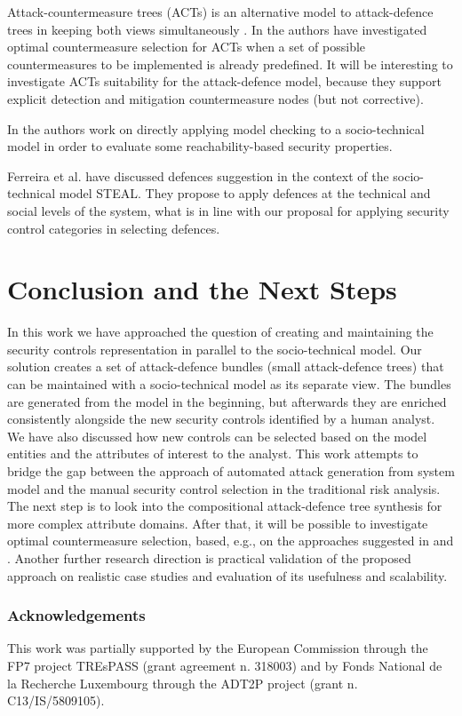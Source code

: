 \documentclass{llncs}
\begin{document}
Attack-countermeasure trees (ACTs) is an alternative model to attack-defence trees in keeping both views simultaneously \cite{Roy-SCN-2011}. In \cite{Roy-DSN-2012} the authors have investigated optimal countermeasure selection for ACTs when a set of possible countermeasures to be implemented is already predefined. It will be interesting to investigate ACTs suitability for the attack-defence model, because they support explicit detection and mitigation countermeasure nodes (but not corrective). 

In \cite{Lenzini-2015} the authors work on directly applying model checking to a socio-technical model in order to evaluate some reachability-based security properties. 

Ferreira et al. \cite{STEAL-2014} have discussed defences suggestion in the context of the socio-technical model STEAL. They propose to apply defences at the technical and social levels of the system, what is in line with our proposal for applying security control categories in selecting defences.

\section{Conclusion and the Next Steps}

In this work we have approached the question of creating and maintaining the security controls representation in parallel to the socio-technical model. Our solution creates a set of attack-defence bundles (small attack-defence trees) that can be maintained with a socio-technical model as its separate view. The bundles are generated from the model in the beginning, but afterwards they are enriched consistently alongside the new security controls identified by a human analyst. We have also discussed how new controls can be selected based on the model entities and the attributes of interest to the analyst. This work attempts to bridge the gap between the approach of automated attack generation from system model and the manual security control selection in the traditional risk analysis. The next step is to look into the compositional attack-defence tree synthesis for more complex attribute domains.  After that, it will be possible to investigate optimal countermeasure selection, based, e.g., on the approaches suggested in \cite{Aslanyan-POST-2015} and \cite{Roy-DSN-2012}. Another further research direction is practical validation of the proposed approach on realistic case studies and evaluation of its usefulness and scalability.

\subsubsection*{Acknowledgements}
This work was partially supported by the European Commission through the FP7 project TREsPASS (grant agreement n. 318003) and by Fonds National de la Recherche Luxembourg through the ADT2P project (grant n. C13/IS/5809105).




\end{document}
